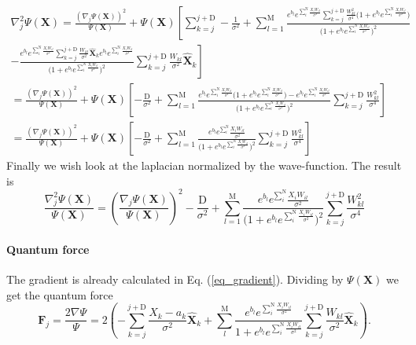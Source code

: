 \begin{align*}	
\nabla^2_j \Psi(\textbf{X}) = \frac{(\nabla_j \Psi(\textbf{X}) )^2}{\Psi(\textbf{X})} + \Psi(\textbf{X})\left[ \sum_{k=j}^{j+\text{D}}-\frac{1}{\sigma^2} + \sum_{l=1}^{\text{M}} \frac{e^{b_l}e^{\sum_{i}^{\text{N}}\frac{X_iW_{il}}{\sigma^2}}\sum_{k=j}^{j+\text{D}} \frac{W_{kl}^2}{\sigma^4}  \Big(1+e^{b_l}e^{\sum_{i}^{\text{N}}\frac{X_iW_{il}}{\sigma^2}}\Big)}{\Big(1+e^{b_l}e^{\sum_{i}^{\text{N}}\frac{X_iW_{il}}{\sigma^2}}\Big)^2} \right.  \\ \left. - \frac{ e^{b_l}e^{\sum_{i}^{\text{N}}\frac{X_iW_{il}}{\sigma^2}}\sum_{k=j}^{j+\text{D}} \frac{W_{kl}}{\sigma^2} \hat{\textbf{X}}_k e^{b_l}e^{\sum_{i}^{\text{N}}\frac{X_iW_{il}}{\sigma^2}} }{\Big(1+e^{b_l}e^{\sum_{i}^{\text{N}}\frac{X_iW_{il}}{\sigma^2}}\Big)^2}   \sum_{k=j}^{j+\text{D}} \frac{W_{kl}}{\sigma^2} \hat{\textbf{X}}_k     \right]  \\
= \frac{(\nabla_j \Psi(\textbf{X}) )^2}{\Psi(\textbf{X})} + \Psi(\textbf{X})\left[-\frac{\text{D}}{\sigma^2} + \sum_{l=1}^{\text{M}}  \frac{e^{b_l}e^{\sum_{i}^{\text{N}}\frac{X_iW_{il}}{\sigma^2}}  \Big(1+e^{b_l}e^{\sum_{i}^{\text{N}}\frac{X_iW_{il}}{\sigma^2}}\Big) - e^{b_l}e^{\sum_{i}^{\text{N}}\frac{X_iW_{il}}{\sigma^2}}}{\Big(1+e^{b_l}e^{\sum_{i}^{\text{N}}\frac{X_iW_{il}}{\sigma^2}}\Big)^2}  \sum_{k=j}^{j+\text{D}} \frac{W^2_{kl}}{\sigma^4}      \right]\\
= \frac{(\nabla_j \Psi(\textbf{X}) )^2}{\Psi(\textbf{X})} + \Psi(\textbf{X})\left[ -\frac{\text{D}}{\sigma^2} + \sum_{l=1}^{\text{M}}   \frac{e^{b_l}e^{\sum_{i}^{\text{N}}}\frac{X_iW_{il}}{\sigma^2}  }{\Big(1+e^{b_l}e^{\sum_{i}^{\text{N}}\frac{X_iW_{il}}{\sigma^2}}\Big)^2}  \sum_{k=j}^{j+\text{D}} \frac{W^2_{kl}}{\sigma^4}      \right]
\end{align*}
Finally we wish look at the laplacian normalized by the wave-function. The result is 
\begin{equation*}
\frac{\nabla_j^2\Psi(\textbf{X})}{\Psi(\textbf{X})}= \left(\frac{\nabla_j \Psi(\textbf{X}) }{\Psi(\textbf{X})}\right)^2 - \frac{\text{D}}{\sigma^2}  + \sum_{l=1}^{\text{M}}   \frac{e^{b_l}e^{\sum_{i}^{\text{N}}}\frac{X_iW_{il}}{\sigma^2}  }{\Big(1+e^{b_l}e^{\sum_{i}^{\text{N}}\frac{X_iW_{il}}{\sigma^2}}\Big)^2}  \sum_{k=j}^{j+\text{D}} \frac{W^2_{kl}}{\sigma^4}     
\label{eq_laplace}
\end{equation*}


\paragraph{Quantum force}
The gradient is already calculated in Eq. (\ref{eq_gradient}). Dividing by $\Psi(\textbf{X})$ we get the quantum force 
\begin{equation*}
\textbf{F}_j = \frac{2\nabla\Psi}{\Psi}=  2\left(  -\sum_{k=j}^{j+\text{D}} \frac{X_k-a_k}{\sigma^2} \hat{\textbf{X}}_k  + \sum_{l}^{\text{M}}\frac{e^{b_l}e^{\sum_{i}^{\text{N}}\frac{X_iW_{il}}{\sigma^2}}}{1+e^{b_l}e^{\sum_{i}^{\text{N}}\frac{X_iW_{il}}{\sigma^2}}}  \sum_{k=j}^{j+\text{D}} \frac{W_{kl}}{\sigma^2} \hat{\textbf{X}}_k    \right).
\label{eq_quantumforce}
\end{equation*}

